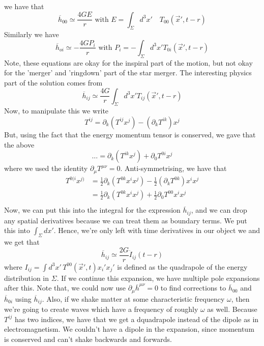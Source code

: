 we have that 
\[
 \overline{h}_{00 } \simeq \frac{4 G E }{ r } \text{ with } 
 E = \int _{ \Sigma } d ^ 3 x ' \quad T _{ 00} \left( \vec{x} ' , t - r  \right)  
\] Similarly we have 
\[
 \overline{ h } _{ oi } \simeq  - \frac{4 G P _ i }{ r } \text{ with } 
 P _ i   = - \int_{ \Sigma } d ^ 3 x ' T _{ 0i } \left( \vec{x} ' , 
 t - r \right) 
\] Note, these equations are 
okay for the inspiral part of the motion, but not 
okay for the 'merger' and 'ringdown' part of the 
star merger. 
The interesting physics part of the solution comes from 
\[
 \overline{ h } _{ ij } \simeq \frac{ 4 G }{ r } \int _{ \Sigma } d ^ 3 x' 
 T _{ ij } \left( \vec{x} ' , t - r \right) 
\] Now, to manipulate this 
we write \[
	T ^{ ij }  = \partial  _ k \left( T ^{ ij } x ^ j  \right)  
- \left( \partial  _ k T ^{ ik }   \right) x ^ j \]
But, using the fact that the energy momentum tensor is 
conserved, we gave that the above 
\[
	\dots = \partial  _ k \left( T ^{ ik } x ^ j   \right)
	 + \partial  _ 0 T ^{ 0i  } x ^ j 
\] where we used the identity $ \partial  _ \mu T ^{ \mu  \nu }  = 0 $. 
Anti-symmetrising, we have that 
\begin{align*}
	T^{ 0 ( i } x ^{ j ) } &=  \frac{1}{2 } \partial  _ k 
	\left( T ^{ 0k } x ^ i x ^ j  \right)    - \frac{1}{2 } \left( \partial  _ k T^{ 0k }  \right)  x ^ i x ^ j \\
			       &=  \frac{1}{2 } \partial  _ k \left( T ^{ 0k } x ^ i x ^ j  \right)  + \frac{1}{2 } \partial  _ 0 T ^{ 0 0 } x ^ i x ^ j  \\
\end{align*}
Now, we can put this into the integral for the 
expression $ \overline{ h } _{ ij}  $, and 
we can drop any spatial derivatives 
because we can treat them as boundary terms. 
We put this into $ \int _{ \Sigma } d x ' $. 
Hence, we're only left with time 
derivatives in our object we and we get that 
\[
	\overline{ h } _{ ij } \simeq \frac{ 2 G }{ r } \ddot{I }_{ij }\left( t - r \right)  
\]  where $ I _{ ij }  = \int d ^ 3 x ' \, T ^{ 0 0 } (\vec{x} ' , t ) x_ i '  x _ j' $
is defined as the quadrapole of the energy distribution in $ \Sigma $.
If we continue this expansion, we have multiple 
pole expansions after this. Note that, 
we could now use $ \partial  _ \mu \overline{ h } ^{ \mu \nu }  = 0 $ to 
find corrections to $ \overline{ h } _{ 0 0 } $ and $ \overline{ h } _{ 0 i} $
using $ \overline{ h } _{ ij } $. Also, 
if we shake matter at some characteristic frequency $ \omega $, 
then we're going to create waves which have a frequency 
of roughly $ \omega $ as well.
Because $ T ^{ ij } $ has two indices, 
we have that we get a dquadrapole instead of 
the dipole as in electromagnetism. 
We couldn't have a dipole in the expansion, 
since momentum is conserved and can't shake backwards 
and forwards.

